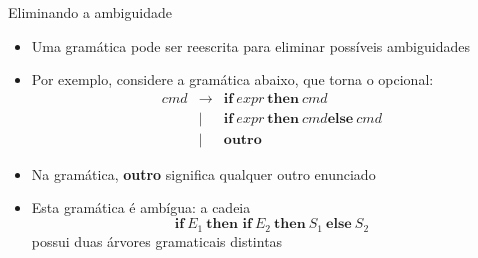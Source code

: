 \begin{frame}[fragile]{Eliminando a ambiguidade}

    \begin{itemize}
        \item Uma gramática pode ser reescrita para eliminar possíveis ambiguidades

        \item Por exemplo, considere a gramática abaixo, que torna o  opcional:
        \[
            \begin{array}{rcl}
                cmd & \to & \textbf{if}\ expr\ \textbf{then}\ cmd \\
                & | & \textbf{if}\ expr\ \textbf{then}\ cmd \textbf{else}\ cmd \\
                & | & \textbf{outro}
            \end{array}
        \]

        \item Na gramática, \textbf{outro} significa qualquer outro enunciado

        \item Esta gramática é ambígua: a cadeia
        \[
            \textbf{if}\ E_1\ \textbf{then if}\ E_2\ \textbf{then}\ S_1\ \textbf{else}\ S_2
        \]
        possui duas árvores gramaticais distintas
    \end{itemize}

\end{frame}

